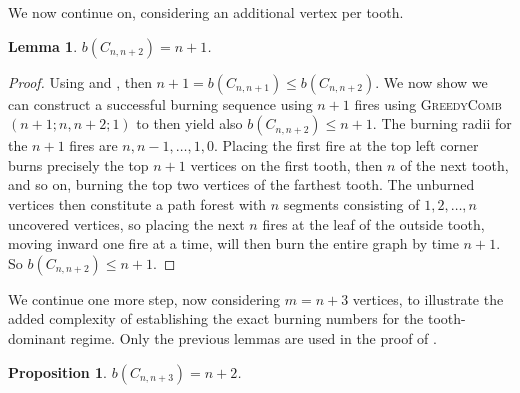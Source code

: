 \documentclass{article}
\newtheorem{lemma}{Lemma}
\newtheorem{proposition}{Proposition}
\newtheorem{remark}{Remark}
\begin{document}
We now continue on, considering an additional vertex per tooth.

\begin{lemma}
    \label{l: n_n+2}
    $b(C_{n,n+2}) = n+1$.
\end{lemma}
\begin{proof}
    Using  and , then $n + 1 = b(C_{n,n+1}) \le b(C_{n,n+2})$. We now show we can construct a successful burning sequence using $n + 1$ fires using \textsc{GreedyComb}$(n+1; n,n+2; 1)$ to then yield also $b(C_{n,n+2}) \le n+1$. The burning radii for the $n+1$ fires are $n,n-1,\ldots,1,0$. Placing the first fire at the top left corner burns precisely the top $n+1$ vertices on the first tooth, then $n$ of the next tooth, and so on, burning the top two vertices of the farthest tooth. The unburned vertices then constitute a path forest with $n$ segments consisting of $1,2,\ldots,n$ uncovered vertices, so placing the next $n$ fires at the leaf of the outside tooth, moving inward one fire at a time, will then burn the entire graph by time $n+1$. So $b(C_{n,n+2}) \le n+1$.
\end{proof}

We continue one more step, now considering $m = n+3$ vertices, to illustrate the added complexity of establishing the exact burning numbers for the tooth-dominant regime. Only the previous lemmas are used in the proof of .

\begin{proposition}\label{prop: n_n+3}
    $b(C_{n,n+3}) = n + 2$.
\end{proposition}
    
\end{document}
